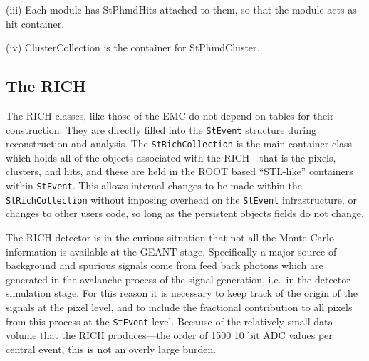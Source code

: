 \documentclass[twoside]{article}
\begin{document}
(iii) Each module has StPhmdHits attached to them, so that the module acts as hit container.

(iv) ClusterCollection is the container for StPhmdCluster.



\subsection{The RICH}
The RICH classes, like those of the EMC do not depend on
tables for their construction.  They are directly filled
into the \texttt{StEvent} structure during reconstruction and
analysis.  The \texttt{StRichCollection} is the main container class
which holds all of the objects associated with the RICH---that
is the pixels, clusters, and hits, and these are held in the
ROOT based ``STL-like'' containers within \texttt{StEvent}.
This allows internal changes to be made within the \texttt{StRichCollection}
without imposing overhead on the \texttt{StEvent} infrastructure,
or changes to other users code, so long as the persistent objects
fields do not change.

The RICH detector is in the curious situation that not all the
Monte Carlo information is available at the GEANT stage.  Specifically
a major source of background and spurious signals come from feed
back photons which are generated in the avalanche process of the
signal generation, i.e.~in
the detector simulation stage.  For this reason it is necessary
to keep track of the origin of the signals at the pixel level,
and to include the fractional contribution to all pixels from this
process at the \texttt{StEvent} level.  Because
of the relatively small data volume that the RICH produces---the order
of 1500 10 bit ADC values per central event, this is not an
overly large burden.
\end{document}
